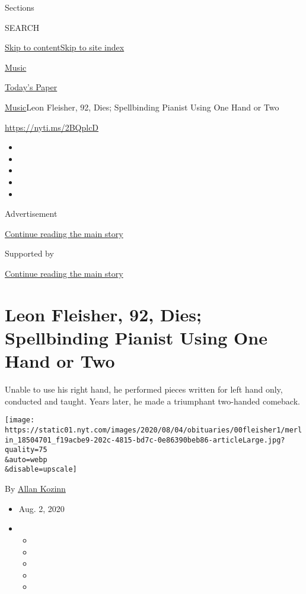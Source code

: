 Sections

SEARCH

\protect\hyperlink{site-content}{Skip to
content}\protect\hyperlink{site-index}{Skip to site index}

\href{https://www.nytimes.com/section/arts/music}{Music}

\href{https://myaccount.nytimes.com/auth/login?response_type=cookie\&client_id=vi}{}

\href{https://www.nytimes.com/section/todayspaper}{Today's Paper}

\href{/section/arts/music}{Music}\textbar{}Leon Fleisher, 92, Dies;
Spellbinding Pianist Using One Hand or Two

\url{https://nyti.ms/2BQplcD}

\begin{itemize}
\item
\item
\item
\item
\item
\end{itemize}

Advertisement

\protect\hyperlink{after-top}{Continue reading the main story}

Supported by

\protect\hyperlink{after-sponsor}{Continue reading the main story}

\hypertarget{leon-fleisher-92-dies-spellbinding-pianist-using-one-hand-or-two}{%
\section{Leon Fleisher, 92, Dies; Spellbinding Pianist Using One Hand or
Two}\label{leon-fleisher-92-dies-spellbinding-pianist-using-one-hand-or-two}}

Unable to use his right hand, he performed pieces written for left hand
only, conducted and taught. Years later, he made a triumphant two-handed
comeback.

\texttt{[image: https://static01.nyt.com/images/2020/08/04/obituaries/00fleisher1/merlin\_18504701\_f19acbe9-202c-4815-bd7c-0e86390beb86-articleLarge.jpg?quality=75\\\&auto=webp\\\&disable=upscale]}

By \href{https://www.nytimes.com/by/allan-kozinn}{Allan Kozinn}

\begin{itemize}
\item
  Aug. 2, 2020
\item
  \begin{itemize}
  \item
  \item
  \item
  \item
  \item
  \end{itemize}
\end{itemize}

